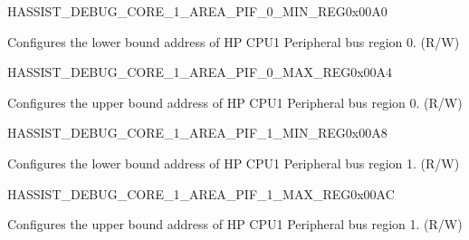 \begin{register}{H}{ASSIST\_DEBUG\_CORE\_1\_AREA\_PIF\_0\_MIN\_REG}{0x00A0}\label{regdesc:ASSISTDEBUGCORE1AREAPIF0MINREG}
%
\regnewline%
\begin{regdesc}\begin{reglist}
\label{fielddesc:ASSISTDEBUGCORE1AREAPIF0MIN}\item [ASSIST\_DEBUG\_CORE\_1\_AREA\_PIF\_0\_MIN] Configures the lower bound address of HP CPU1 Peripheral bus region 0. (R/W)
\end{reglist}\end{regdesc}
\end{register}


\begin{register}{H}{ASSIST\_DEBUG\_CORE\_1\_AREA\_PIF\_0\_MAX\_REG}{0x00A4}\label{regdesc:ASSISTDEBUGCORE1AREAPIF0MAXREG}
%
\regnewline%
\begin{regdesc}\begin{reglist}
\label{fielddesc:ASSISTDEBUGCORE1AREAPIF0MAX}\item [ASSIST\_DEBUG\_CORE\_1\_AREA\_PIF\_0\_MAX] Configures the upper bound address of HP CPU1 Peripheral bus region 0. (R/W)
\end{reglist}\end{regdesc}
\end{register}


\begin{register}{H}{ASSIST\_DEBUG\_CORE\_1\_AREA\_PIF\_1\_MIN\_REG}{0x00A8}\label{regdesc:ASSISTDEBUGCORE1AREAPIF1MINREG}
%
\regnewline%
\begin{regdesc}\begin{reglist}
\label{fielddesc:ASSISTDEBUGCORE1AREAPIF1MIN}\item [ASSIST\_DEBUG\_CORE\_1\_AREA\_PIF\_1\_MIN] Configures the lower bound address of HP CPU1 Peripheral bus region 1. (R/W)
\end{reglist}\end{regdesc}
\end{register}


\begin{register}{H}{ASSIST\_DEBUG\_CORE\_1\_AREA\_PIF\_1\_MAX\_REG}{0x00AC}\label{regdesc:ASSISTDEBUGCORE1AREAPIF1MAXREG}
%
\regnewline%
\begin{regdesc}\begin{reglist}
\label{fielddesc:ASSISTDEBUGCORE1AREAPIF1MAX}\item [ASSIST\_DEBUG\_CORE\_1\_AREA\_PIF\_1\_MAX] Configures the upper bound address of HP CPU1 Peripheral bus region 1. (R/W)
\end{reglist}\end{regdesc}
\end{register}



